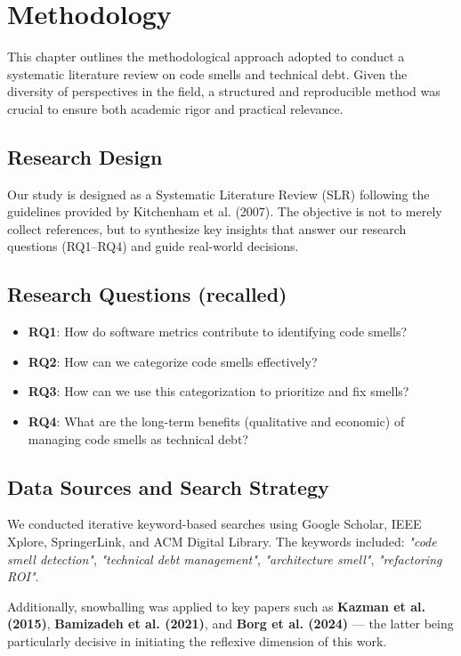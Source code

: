 
\section{Methodology}

This chapter outlines the methodological approach adopted to conduct a systematic literature review on code smells and technical debt. Given the diversity of perspectives in the field, a structured and reproducible method was crucial to ensure both academic rigor and practical relevance.

\subsection{Research Design}

Our study is designed as a Systematic Literature Review (SLR) following the guidelines provided by Kitchenham et al. (2007). The objective is not to merely collect references, but to synthesize key insights that answer our research questions (RQ1–RQ4) and guide real-world decisions.

\subsection{Research Questions (recalled)}
\begin{itemize}
    \item \textbf{RQ1}: How do software metrics contribute to identifying code smells?
    \item \textbf{RQ2}: How can we categorize code smells effectively?
    \item \textbf{RQ3}: How can we use this categorization to prioritize and fix smells?
    \item \textbf{RQ4}: What are the long-term benefits (qualitative and economic) of managing code smells as technical debt?
\end{itemize}

\subsection{Data Sources and Search Strategy}

We conducted iterative keyword-based searches using Google Scholar, IEEE Xplore, SpringerLink, and ACM Digital Library. The keywords included: \textit{"code smell detection"}, \textit{"technical debt management"}, \textit{"architecture smell"}, \textit{"refactoring ROI"}.

Additionally, snowballing was applied to key papers such as \textbf{Kazman et al. (2015)}, \textbf{Bamizadeh et al. (2021)}, and \textbf{Borg et al. (2024)} — the latter being particularly decisive in initiating the reflexive dimension of this work.

